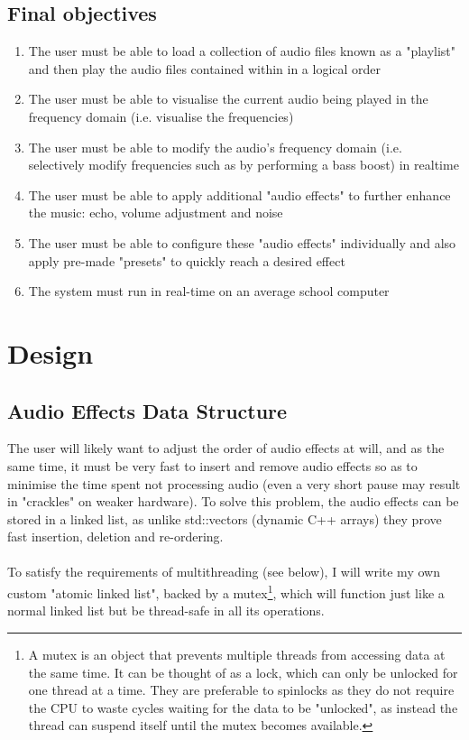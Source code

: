 \documentclass{article}
\begin{document}
	\subsection{Final objectives}
	\begin{enumerate}
	\item  The user must be able to load a collection of audio files known as a "playlist" and then play the audio files contained within in a logical order
	\item  The user must be able to visualise the current audio being played in the frequency domain (i.e. visualise the frequencies)
	\item The user must be able to modify the audio's frequency domain (i.e. selectively modify frequencies such as by performing a bass boost) in realtime
	\item The user must be able to apply additional "audio effects" to further enhance the music: echo, volume adjustment and noise
	\item The user must be able to configure these "audio effects" individually and also apply pre-made "presets" to quickly reach a desired effect
	\item  The system must run in real-time on an average school computer
	\end{enumerate}


	\pagebreak
	\section { Design }
	
	\subsection{Audio Effects Data Structure}
	The user will likely want to adjust the order of audio effects at will, and as the same time, it must be very fast to insert and  remove audio effects so as to minimise the time spent not processing audio (even a very short pause may result in "crackles" on weaker hardware). To solve this problem, the audio effects can be stored in a linked list, as unlike std::vectors (dynamic C++ arrays) they prove fast insertion, deletion and re-ordering.
	
	\paragraph{}
	To satisfy the requirements of multithreading (see below), I will write my own custom "atomic linked list", backed by a mutex\footnote{
		A mutex is an object that prevents multiple threads from accessing data at the same time. It can be thought of as a lock, which can only be unlocked for one thread at a time. They are preferable to spinlocks as they do not require the CPU to waste cycles waiting for the data to be "unlocked", as instead the thread can suspend itself until the mutex becomes available.
	}, which will function just like a normal linked list but be thread-safe in all its operations.
	
\end{document}
